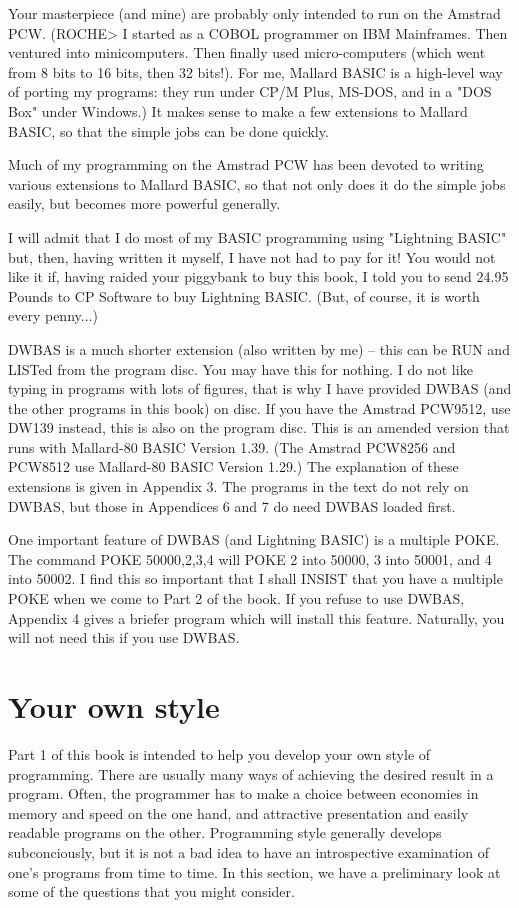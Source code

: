 \documentclass[]{report} %
\begin{document}
Your  masterpiece (and mine) are probably only intended to run on the  Amstrad 
PCW. (ROCHE> I started as a COBOL programmer on IBM Mainframes. Then  ventured 
into minicomputers. Then finally used micro-computers (which went from 8  bits 
to  16  bits,  then 32 bits!). For me, Mallard BASIC is a  high-level  way  of 
porting  my  programs: they run under CP/M Plus, MS-DOS, and in  a  "DOS  Box" 
under  Windows.) It makes sense to make a few extensions to Mallard BASIC,  so 
that the simple jobs can be done quickly.

Much of my programming on the Amstrad PCW has been devoted to writing  various 
extensions  to  Mallard  BASIC, so that not only does it do  the  simple  jobs 
easily, but becomes more powerful generally.

I  will admit that I do most of my BASIC programming using  "Lightning  BASIC" 
but,  then, having written it myself, I have not had to pay for it! You  would 
not  like it if, having raided your piggybank to buy this book, I told you  to 
send  24.95 Pounds to CP Software to buy Lightning BASIC. (But, of course,  it 
is worth every penny...)

DWBAS is a much shorter extension (also written by me) -- this can be RUN  and 
LISTed  from  the program disc. You may have this for nothing. I do  not  like 
typing  in  programs with lots of figures, that is why I have  provided  DWBAS 
(and  the  other  programs  in this book) on disc. If  you  have  the  Amstrad 
PCW9512,  use  DW139  instead, this is also on the program disc.  This  is  an 
amended  version  that runs with Mallard-80 BASIC Version 1.39.  (The  Amstrad 
PCW8256  and  PCW8512 use Mallard-80 BASIC Version 1.29.) The  explanation  of 
these extensions is given in Appendix 3. The programs in the text do not  rely 
on DWBAS, but those in Appendices 6 and 7 do need DWBAS loaded first.

One  important feature of DWBAS (and Lightning BASIC) is a multiple POKE.  The 
command  POKE  50000,2,3,4 will POKE 2 into 50000, 3 into 50001,  and  4  into 
50002.  I find this so important that I shall INSIST that you have a  multiple 
POKE when we come to Part 2 of the book. If you refuse to use DWBAS,  Appendix 
4 gives a briefer program which will install this feature. Naturally, you will 
not need this if you use DWBAS.

\section{Your own style}
Part  1  of  this  book is intended to help you  develop  your  own  style  of 
programming. There are usually many ways of achieving the desired result in  a 
program.  Often,  the  programmer has to make a choice  between  economies  in 
memory  and  speed  on the one hand, and attractive  presentation  and  easily 
readable   programs  on  the  other.  Programming  style  generally   develops 
subconciously,  but it is not a bad idea to have an introspective  examination 
of  one's programs from time to time. In this section, we have  a  preliminary 
look at some of the questions that you might consider.
\end{document}
